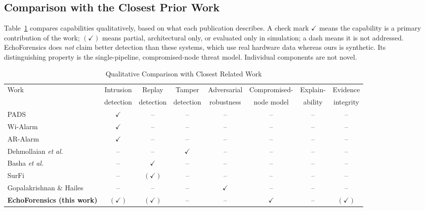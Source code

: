 \documentclass[conference]{IEEEtran}
\begin{document}
\subsection{Comparison with the Closest Prior Work}
Table~\ref{tab:compare} compares capabilities qualitatively, based on what each publication describes. A check mark $\checkmark$ means the capability is a primary contribution of the work; $(\checkmark)$ means partial, architectural only, or evaluated only in simulation; a dash means it is not addressed. EchoForensics does \emph{not} claim better detection than these systems, which use real hardware data whereas ours is synthetic. Its distinguishing property is the single-pipeline, compromised-node threat model. Individual components are not novel.

\begin{table}[t]
\caption{Qualitative Comparison with Closest Related Work}
\label{tab:compare}
\centering
\small
\begin{tabular}{lccccccc}
\toprule
Work & Intrusion & Replay & Tamper & Adversarial & Compromised- & Explain- & Evidence \\
 & detection & detection & detection & robustness & node model & ability & integrity \\
\midrule
PADS~\cite{qian2014pads} & $\checkmark$ & -- & -- & -- & -- & -- & -- \\
Wi-Alarm~\cite{wang2019wialarm} & $\checkmark$ & -- & -- & -- & -- & -- & -- \\
AR-Alarm~\cite{li2017aralarm} & $\checkmark$ & -- & -- & -- & -- & -- & -- \\
Dehmollaian \emph{et al.}~\cite{dehmollaian2020} & -- & -- & $\checkmark$ & -- & -- & -- & -- \\
Basha \emph{et al.}~\cite{basha2024} & -- & $\checkmark$ & -- & -- & -- & -- & -- \\
SurFi~\cite{lakshmanan2019surfi} & -- & $(\checkmark)$ & -- & -- & -- & -- & -- \\
Gopalakrishnan \& Hailes~\cite{gopalakrishnan2025} & -- & -- & -- & $\checkmark$ & -- & -- & -- \\
\midrule
\textbf{EchoForensics (this work)} & $(\checkmark)$ & $(\checkmark)$ & -- & -- & $\checkmark$ & -- & $(\checkmark)$ \\
\bottomrule
\end{tabular}
\end{table}

\end{document}
